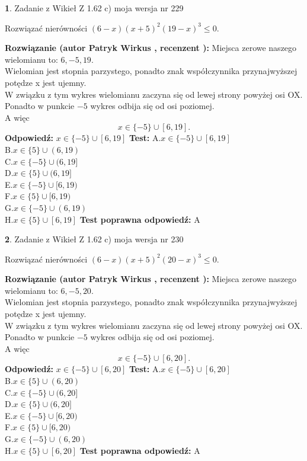\documentclass[12pt, a4paper]{article}
\theoremstyle{definition} %
\newtheorem{zad}{}
\newcommand{\zadStart}[1]{\begin{zad}#1\newline}
\newcommand{\zadStop}{\end{zad}}
\newcommand{\rozwStart}[2]{\noindent \textbf{Rozwiązanie (autor #1 , recenzent #2): }\newline}
\newcommand{\rozwStop}{\newline}
\newcommand{\odpStart}{\noindent \textbf{Odpowiedź:}\newline}
\newcommand{\odpStop}{\newline}
\newcommand{\testStart}{\noindent \textbf{Test:}\newline}
\newcommand{\testStop}{\newline}
\newcommand{\kluczStart}{\noindent \textbf{Test poprawna odpowiedź:}\newline}
\newcommand{\kluczStop}{\newline}
\begin{document}
\zadStart{Zadanie z Wikieł Z 1.62 c) moja wersja nr 229}

Rozwiązać nierówności $(6-x)(x+5)^{2}(19-x)^{3}\le0$.
\zadStop
\rozwStart{Patryk Wirkus}{}
Miejsca zerowe naszego wielomianu to: $6, -5, 19$.\\
Wielomian jest stopnia parzystego, ponadto znak współczynnika przy\linebreak najwyższej potędze x jest ujemny.\\ W związku z tym wykres wielomianu zaczyna się od lewej strony powyżej osi OX.\\
Ponadto w punkcie $-5$ wykres odbija się od osi poziomej.\\
A więc $$x \in \{-5\} \cup [6,19].$$
\rozwStop
\odpStart
$x \in \{-5\} \cup [6,19]$
\odpStop
\testStart
A.$x \in \{-5\} \cup [6,19]$\\
B.$x \in \{5\} \cup (6,19)$\\
C.$x \in \{-5\} \cup (6,19]$\\
D.$x \in \{5\} \cup (6,19]$\\
E.$x \in \{-5\} \cup [6,19)$\\
F.$x \in \{5\} \cup [6,19)$\\
G.$x \in \{-5\} \cup (6,19)$\\
H.$x \in \{5\} \cup [6,19]$
\testStop
\kluczStart
A
\kluczStop



\zadStart{Zadanie z Wikieł Z 1.62 c) moja wersja nr 230}

Rozwiązać nierówności $(6-x)(x+5)^{2}(20-x)^{3}\le0$.
\zadStop
\rozwStart{Patryk Wirkus}{}
Miejsca zerowe naszego wielomianu to: $6, -5, 20$.\\
Wielomian jest stopnia parzystego, ponadto znak współczynnika przy\linebreak najwyższej potędze x jest ujemny.\\ W związku z tym wykres wielomianu zaczyna się od lewej strony powyżej osi OX.\\
Ponadto w punkcie $-5$ wykres odbija się od osi poziomej.\\
A więc $$x \in \{-5\} \cup [6,20].$$
\rozwStop
\odpStart
$x \in \{-5\} \cup [6,20]$
\odpStop
\testStart
A.$x \in \{-5\} \cup [6,20]$\\
B.$x \in \{5\} \cup (6,20)$\\
C.$x \in \{-5\} \cup (6,20]$\\
D.$x \in \{5\} \cup (6,20]$\\
E.$x \in \{-5\} \cup [6,20)$\\
F.$x \in \{5\} \cup [6,20)$\\
G.$x \in \{-5\} \cup (6,20)$\\
H.$x \in \{5\} \cup [6,20]$
\testStop
\kluczStart
A
\kluczStop
\end{document}
